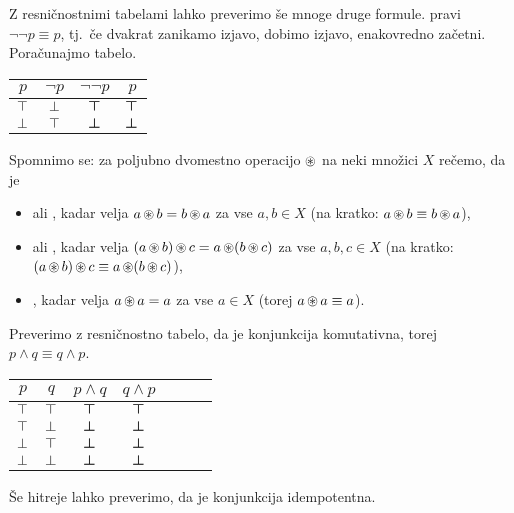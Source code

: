 		Z resničnostnimi tabelami lahko preverimo še mnoge druge formule.  pravi $\lnot\lnot{p} \equiv p$, tj.~če dvakrat zanikamo izjavo, dobimo izjavo, enakovredno začetni. Poračunajmo tabelo.
		
		\begin{center}
			\begin{tabular}{c|ccc}
				$p$ & $\lnot{p}$ & $\lnot\lnot{p}$ & $p$ \\
				\hline
				$\top$ & $\bot$ & $\bm{\top}$ & $\bm{\top}$ \\
				$\bot$ & $\top$ & $\bm{\bot}$ & $\bm{\bot}$
			\end{tabular}
		\end{center}
		
		Spomnimo se: za poljubno dvomestno operacijo $\mathop{\circledast}$ na neki množici $X$ rečemo, da je
		\begin{itemize}
			\item
				 ali , kadar velja $a \mathop{\circledast} b = b \mathop{\circledast} a$ za vse $a, b \in X$ (na kratko: $a \mathop{\circledast} b \equiv b \mathop{\circledast} a$),
			\item
				  ali , kadar velja $(a \mathop{\circledast} b) \mathop{\circledast} c = a \mathop{\circledast} (b \mathop{\circledast} c)$ za vse $a, b, c \in X$ (na kratko: $(a \mathop{\circledast} b) \mathop{\circledast} c \equiv a \mathop{\circledast} (b \mathop{\circledast} c)$),
			\item
				 , kadar velja $a \mathop{\circledast} a = a$ za vse $a \in X$ (torej $a \mathop{\circledast} a \equiv a$).
		\end{itemize}
		
		Preverimo z resničnostno tabelo, da je konjunkcija komutativna, torej $p \land q \equiv q \land p$.
		
		\begin{center}
			\begin{tabular}{cc|ccccc}
				$p$ & $q$ & $p \land q$ & $q \land p$ \\
				\hline
				$\top$ & $\top$ & $\bm{\top}$ & $\bm{\top}$ \\
				$\top$ & $\bot$ & $\bm{\bot}$ & $\bm{\bot}$ \\
				$\bot$ & $\top$ & $\bm{\bot}$ & $\bm{\bot}$ \\
				$\bot$ & $\bot$ & $\bm{\bot}$ & $\bm{\bot}$
			\end{tabular}
		\end{center}
		
		Še hitreje lahko preverimo, da je konjunkcija idempotentna.
		
